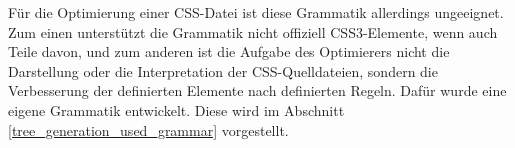 Für die Optimierung einer CSS-Datei ist diese Grammatik allerdings ungeeignet. Zum einen unterstützt die Grammatik nicht offiziell CSS3-Elemente, wenn auch Teile davon, und zum anderen ist die Aufgabe des Optimierers nicht die Darstellung oder die Interpretation der CSS-Quelldateien, sondern die Verbesserung der definierten Elemente nach definierten Regeln. Dafür wurde eine eigene Grammatik entwickelt. Diese wird im Abschnitt \ref{tree_generation_used_grammar} vorgestellt. 


